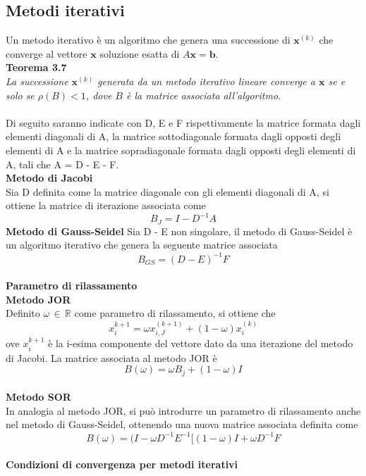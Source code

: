 \documentclass[a4paper,12pt]{article}
\begin{document}
\subsection{Metodi iterativi}
Un metodo iterativo è un algoritmo che genera una successione di $\textbf{x}^{(k)}$ che converge al vettore $\textbf{x}$ soluzione esatta di $A\textbf{x} = \textbf{b}$. \\
\textbf{Teorema 3.7} \\
\textit{La successione $\textbf{x}^{(k)}$ generata da un metodo iterativo lineare converge a $\textbf{x}$ se e solo se $\rho(B) < 1$, dove $B$ è la matrice associata all'algoritmo.} \\
\\
Di seguito saranno indicate con D, E e F rispettivamente la matrice formata dagli elementi diagonali di A, la matrice sottodiagonale formata dagli opposti degli elementi di A e la matrice sopradiagonale formata dagli opposti degli elementi di A, tali che A = D - E - F. \\
\textbf{Metodo di Jacobi} \\
Sia D definita come la matrice diagonale con gli elementi diagonali di A, si ottiene la matrice di iterazione associata  come $$B_{J} = I - D^{-1}A $$
\textbf{Metodo di Gauss-Seidel}
Sia D - E non singolare, il metodo di Gauss-Seidel è un algoritmo iterativo che genera la seguente matrice associata $$B_{GS} = (D - E)^{-1}F$$ \\
\textbf{Parametro di rilassamento} \\
\textbf{Metodo JOR} \\
Definito $\omega \, \in \, \mathbb{R}$ come parametro di rilassamento, si ottiene che $$x_{i}^{k+1} = \omega x_{i,J}^{(k+1)}+ (1 -\omega)x_{i}^{(k)}$$ ove $x_{i}^{k+1}$ è la i-esima componente del vettore dato da una iterazione del metodo di Jacobi. 
La matrice associata al metodo JOR è
$$B(\omega) = \omega B_{j} + (1 - \omega)I$$ \\
\textbf{Metodo SOR} \\
In analogia al metodo JOR, si può introdurre un parametro di rilassamento anche nel metodo di Gauss-Seidel, ottenendo una nuova matrice associata definita come $$B(\omega) = (I - \omega D^{-1}E^{-1}[(1 - \omega)I + \omega D^{-1} F$$ \\
\textbf{Condizioni di convergenza per metodi iterativi} \\
\end{document}
